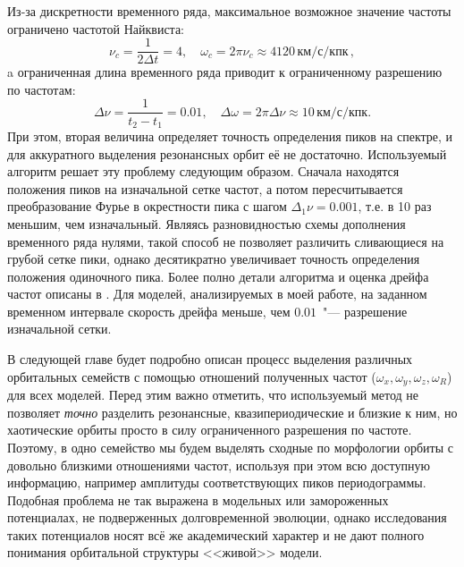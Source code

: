 \documentclass{trlnotes}
\begin{document}
Из-за дискретности временного ряда, максимальное возможное значение частоты ограничено частотой Найквиста: 
\[
  ν_c = \frac{1}{2 Δt} = 4, \quad ω_c = 2\pi ν_c \approx 4120\,\text{км}/\text{с}/\text{кпк}\,,
\]
a ограниченная длина временного ряда приводит к ограниченному разрешению по частотам: 
\[
  Δν = \frac{1}{t_2 - t_1} = 0.01, \quad Δω = 2\pi Δν \approx 10\,\text{км}/\text{с}/\text{кпк}.
\]
При этом, вторая величина определяет точность определения пиков на спектре, и для аккуратного выделения резонансных
орбит её не достаточно.  Используемый алгоритм решает эту проблему следующим образом. Сначала находятся положения пиков
на изначальной сетке частот, а потом пересчитывается преобразование Фурье в окрестности пика с шагом $Δ_1ν = 0.001$, т.е. в 10 раз меньшим, чем изначальный.
Являясь разновидностью схемы дополнения временного ряда нулями, такой способ не позволяет различить сливающиеся на
грубой сетке пики, однако десятикратно увеличивает точность определения положения одиночного пика. Более полно детали
алгоритма и оценка дрейфа частот описаны в \citet{parul2020}. Для моделей, анализируемых в моей работе, на заданном
временном интервале скорость дрейфа меньше, чем $0.01$~"--- разрешение изначальной сетки.

В следующей главе будет подробно описан процесс выделения различных орбитальных семейств с помощью отношений полученных
частот ($ω_x, ω_y, ω_z, ω_R$) для всех моделей. Перед этим важно отметить, что используемый метод не позволяет
\emph{точно} разделить резонансные, квазипериодические и близкие к ним, но хаотические орбиты просто в силу
ограниченного разрешения по частоте. Поэтому, в одно семейство мы будем выделять сходные по морфологии орбиты с
довольно близкими отношениями частот, используя при этом всю доступную информацию, например амплитуды соответствующих
пиков периодограммы. Подобная проблема не так выражена в модельных или замороженных потенциалах, не подверженных
долговременной эволюции, однако исследования таких потенциалов носят всё же академический характер и не дают полного
понимания орбитальной структуры <<живой>> модели.
\end{document}
